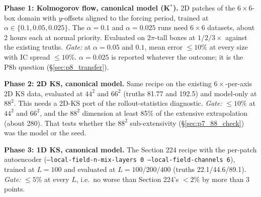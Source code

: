 \documentclass[11pt]{article}
\begin{document}
\textbf{Phase 1: Kolmogorov flow, canonical model (K$^*$).} 2D patches
of the $6\times6$-box domain with $y$-offsets aligned to the forcing
period, trained at $\alpha\in\{0.1, 0.05, 0.025\}$. The $\alpha{=}0.1$
and $\alpha{=}0.025$ runs need $6\times6$ datasets, about 2 hours each at
normal priority. Evaluated on $2\pi$-tall boxes at $1/2/3\times$ against
the existing truths. \emph{Gate:} at $\alpha{=}0.05$ and $0.1$, mean
error $\le10\%$ at every size with IC spread $\le10\%$. $\alpha{=}0.025$
is reported whatever the outcome; it is the P8b question
(\S\ref{sec:p8_transfer}).

\textbf{Phase 2: 2D KS, canonical model.} Same recipe on the existing
$6\times$-per-axis 2D KS data, evaluated at $44^2$ and $66^2$ (truths
81.77 and 192.5) and model-only at $88^2$. This needs a 2D-KS port of
the rollout-statistics diagnostic. \emph{Gate:} $\le10\%$ at $44^2$ and
$66^2$, and the $88^2$ dimension at least 85\% of the extensive
extrapolation (about 280). That tests whether the $88^2$
sub-extensivity (\S\ref{sec:p7_88_check}) was the model or the seed.

\textbf{Phase 3: 1D KS, canonical model.} The Section 224 recipe with
the per-patch autoencoder (\texttt{--local-field-n-mix-layers 0
--local-field-channels 6}), trained at $L{=}100$ and evaluated at
$L{=}100/200/400$ (truths 22.1/44.6/89.1). \emph{Gate:} $\le5\%$ at
every $L$, i.e.\ no worse than Section 224's $<2\%$ by more than 3 points.
\end{document}
